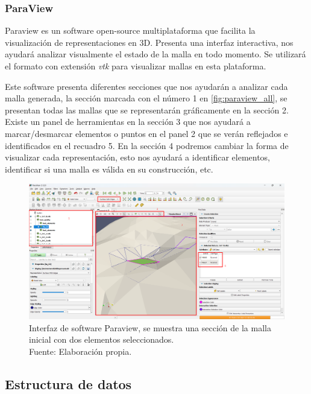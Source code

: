 \subsubsection{ParaView}

Paraview es un software open-source multiplataforma que facilita la \\ visualización de representaciones en 3D. Presenta una interfaz interactiva, nos ayudará analizar visualmente el estado de la malla en todo momento. Se utilizará el formato con extensión \textit{vtk} para visualizar mallas en esta plataforma.

Este software presenta diferentes secciones que nos ayudarán a analizar cada malla generada, la sección marcada con el número 1 en \autoref{fig:paraview_all}, se presentan todas las mallas que se representarán gráficamente en la sección 2. Existe un panel de herramientas en la sección 3 que nos ayudará a marcar/desmarcar elementos o puntos en el panel 2 que se verán reflejados e identificados en el recuadro 5.
En la sección 4 podremos cambiar la forma de visualizar cada representación, esto nos ayudará a identificar elementos, identificar si una malla es válida en su construcción, etc.

\begin{figure}[!ht]
    \centering
    \includegraphics[width=1.0\textwidth]{figures/paraview/paraview_all.png}
    \caption{ Interfaz de software Paraview, se muestra una sección de la malla inicial con dos elementos seleccionados.\\  Fuente: Elaboración propia.}
    \label{fig:paraview_all}
\end{figure}

\subsection{Estructura de datos}

